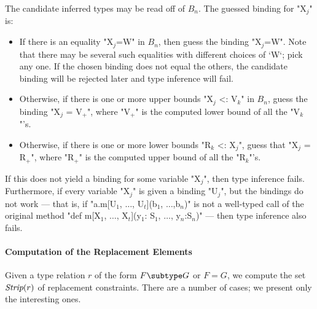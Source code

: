 The candidate inferred types may be read off of {$B_n$}.  The guessed binding
for \xcdmath"X$_j$" is: 
\begin{itemize}
\item If there is an equality \xcdmath"X$_j$=W" in {$B_n$}, then guess the
      binding \xcdmath"X$_j$=W".  Note that there may be several such
      equalities with different choices of \xcd`W`; pick any one.  If the
      chosen binding does not equal the others, the candidate binding will be
      rejected later and type inference will fail. 
\item Otherwise, if there is one or more upper bounds 
\xcdmath"X$_j$ <: V$_k$" in {$B_n$}, guess the binding 
\xcdmath"X$_j$ = V$_+$", where 
\xcdmath"V$_+$" is the computed lower bound of all the \xcdmath"V$_k$"'s.
\item Otherwise, if there is one or more lower bounds 
\xcdmath"R$_k$ <: X$_j$", guess that
\xcdmath"X$_j$ = R$_+$", where 
\xcdmath"R$_+$" is the computed upper bound of all the \xcdmath"R$_k$"'s.
\end{itemize}
If this does not yield a binding for some variable \xcdmath"X$_j$", then type
inference fails.  Furthermore, if every variable \xcdmath"X$_j$" is given a
binding \xcdmath"U$_j$", but the 
bindings do not work --- 
that is, if 
\xcdmath"a.m[U$_1$, $\ldots$, U$_t$](b$_1$, $\ldots$,b$_n$)"
is not a well-typed call of 
the original method 
\xcdmath"def m[X$_1$, $\ldots$, X$_t$](y$_1$: S$_1$, $\ldots$, y$_n$:S$_n$)"
--- then type inference also fails.

\paragraph{Computation of the Replacement Elements}

Given a type relation
{$r$} of the form {$F \subtype G$}
or {$F = G$}, we compute the set {$\mbox{\it Strip}(r)$} of
replacement constraints.  There are a number of cases; we present only the
interesting ones. 

